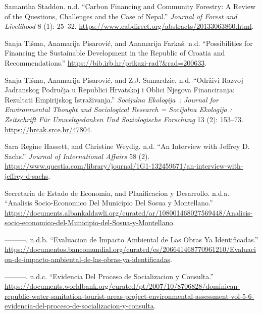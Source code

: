 \begin{CSLReferences}{1}{0}
Samantha Staddon. n.d. {``Carbon Financing and Community Forestry: A
Review of the Questions, Challenges and the Case of Nepal.''}
\emph{Journal of Forest and Livelihood} 8 (1): 25--32.
\url{https://www.cabdirect.org/abstracts/20133063860.html}.

Sanja Tišma, Anamarija Pisarović, and Anamarija Farkaš. n.d.
{``Possibilities for Financing the Sustainable Development in the
Republic of Croatia and Recommendations.''}
\url{https://bib.irb.hr/prikazi-rad?&rad=200633}.

Sanja Tišma, Anamarija Pisarović, and Z.J. Samardzic. n.d. {``Održivi
Razvoj Jadranskog Područja u Republici Hrvatskoj i Oblici Njegova
Financiranja: Rezultati Empirijskog Istraživanja.''} \emph{Socijalna
Ekologija~: Journal for Environmental Thought and Sociological Research
= Socijalna Ekologija : Zeitschrift Für Umweltgedanken Und Soziologische
Forschung} 13 (2): 153--73. \url{https://hrcak.srce.hr/47804}.

Sara Regine Hassett, and Christine Weydig. n.d. {``An Interview with
Jeffrey D. Sachs.''} \emph{Journal of International Affairs} 58 (2).
\url{https://www.questia.com/library/journal/1G1-132459671/an-interview-with-jeffrey-d-sachs}.

Secretaria de Estado de Economia, and Planificacion y Desarrollo. n.d.a.
{``Analisis Socio-Economico Del Municipio Del Sosua y Montellano.''}
\url{https://documents.albankaldawli.org/curated/ar/108001468027569448/Analisis-socio-economico-del-Municipio-del-Sosua-y-Montellano}.

---------. n.d.b. {``Evaluacion de Impacto Ambiental de Las Obras Ya
Identificadas.''}
\url{https://documentos.bancomundial.org/curated/es/206641468770961210/Evaluacion-de-impacto-ambiental-de-las-obras-ya-identificadas}.

---------. n.d.c. {``Evidencia Del Proceso de Socializacion y
Consulta.''}
\url{https://documents.worldbank.org/curated/pt/2007/10/8706828/dominican-republic-water-sanitation-tourist-areas-project-environmental-assessment-vol-5-6-evidencia-del-proceso-de-socializacion-y-consulta}.


\end{CSLReferences}
